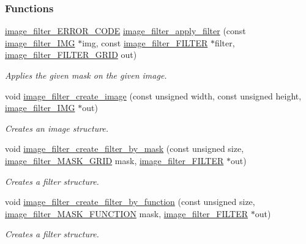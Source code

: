 \subsubsection*{Functions}
\begin{DoxyCompactItemize}
\item 
\hyperlink{a00012_a82e8ecafbcdb867e945139ffe89f63c4}{image\-\_\-filter\-\_\-\-E\-R\-R\-O\-R\-\_\-\-C\-O\-D\-E} \hyperlink{a00012_a67aae70446c59e40f48107bbf7a86202}{image\-\_\-filter\-\_\-apply\-\_\-filter} (const \hyperlink{a00004}{image\-\_\-filter\-\_\-\-I\-M\-G} $\ast$img, const \hyperlink{a00003}{image\-\_\-filter\-\_\-\-F\-I\-L\-T\-E\-R} $\ast$filter, \hyperlink{a00012_a3d41ec3c203c47ad7dec21ff55acc883}{image\-\_\-filter\-\_\-\-F\-I\-L\-T\-E\-R\-\_\-\-G\-R\-I\-D} out)
\begin{DoxyCompactList}\small\item\em Applies the given mask on the given image. \end{DoxyCompactList}\item 
void \hyperlink{a00012_a80e8ffd950b89c44cc362bea62e76d91}{image\-\_\-filter\-\_\-create\-\_\-image} (const unsigned width, const unsigned height, \hyperlink{a00004}{image\-\_\-filter\-\_\-\-I\-M\-G} $\ast$out)
\begin{DoxyCompactList}\small\item\em Creates an image structure. \end{DoxyCompactList}\item 
void \hyperlink{a00012_aca91506fce47f276e33c01ee1a619825}{image\-\_\-filter\-\_\-create\-\_\-filter\-\_\-by\-\_\-mask} (const unsigned size, \hyperlink{a00012_a8249e3d997dddbfdce6ef81c25b1f3b3}{image\-\_\-filter\-\_\-\-M\-A\-S\-K\-\_\-\-G\-R\-I\-D} mask, \hyperlink{a00003}{image\-\_\-filter\-\_\-\-F\-I\-L\-T\-E\-R} $\ast$out)
\begin{DoxyCompactList}\small\item\em Creates a filter structure. \end{DoxyCompactList}\item 
void \hyperlink{a00012_aa7b441e45e2b04ed993b8e75a69dfb50}{image\-\_\-filter\-\_\-create\-\_\-filter\-\_\-by\-\_\-function} (const unsigned size, \hyperlink{a00012_a870dae88660f8c99b3ffeb9a440e78e2}{image\-\_\-filter\-\_\-\-M\-A\-S\-K\-\_\-\-F\-U\-N\-C\-T\-I\-O\-N} mask, \hyperlink{a00003}{image\-\_\-filter\-\_\-\-F\-I\-L\-T\-E\-R} $\ast$out)
\begin{DoxyCompactList}\small\item\em Creates a filter structure. \end{DoxyCompactList}\item 

\end{DoxyCompactItemize}
